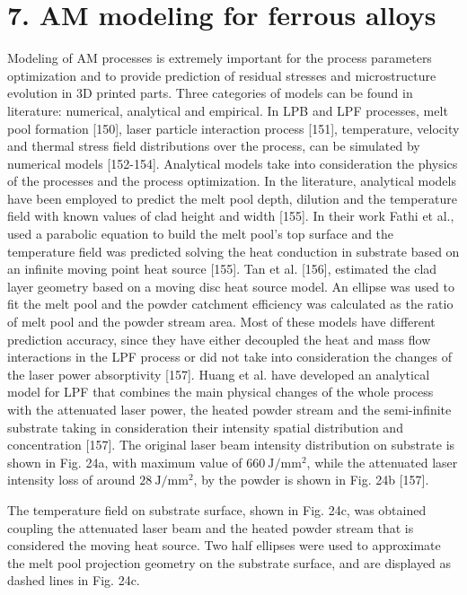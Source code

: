 \documentclass[10pt]{article}
\begin{document}
\section*{7. AM modeling for ferrous alloys}
Modeling of AM processes is extremely important for the process parameters optimization and to provide prediction of residual stresses and microstructure evolution in 3D printed parts. Three categories of models can be found in literature: numerical, analytical and empirical. In LPB and LPF processes, melt pool formation [150], laser particle interaction process [151], temperature, velocity and thermal stress field distributions over the process, can be simulated by numerical models [152-154]. Analytical models take into consideration the physics of the processes and the process optimization. In the literature, analytical models have been employed to predict the melt pool depth, dilution and the temperature field with known values of clad height and width [155]. In their work Fathi et al., used a parabolic equation to build the melt pool's top surface and the temperature field was predicted solving the heat conduction in substrate based on an infinite moving point heat source [155]. Tan et al. [156], estimated the clad layer geometry based on a moving disc heat source model. An ellipse was used to fit the melt pool and the powder catchment efficiency was calculated as the ratio of melt pool and the powder stream area. Most of these models have different prediction accuracy, since they have either decoupled the heat and mass flow interactions in the LPF process or did not take into consideration the changes of the laser power absorptivity [157]. Huang et al. have developed an analytical model for LPF that combines the main physical changes of the whole process with the attenuated laser power, the heated powder stream and the semi-infinite substrate taking in consideration their intensity spatial distribution and concentration [157]. The original laser beam intensity distribution on substrate is shown in Fig. 24a, with maximum value of $660 \mathrm{~J} / \mathrm{mm}^{2}$, while the attenuated laser intensity loss of around $28 \mathrm{~J} / \mathrm{mm}^{2}$, by the powder is shown in Fig. 24b [157].

The temperature field on substrate surface, shown in Fig. 24c, was obtained coupling the attenuated laser beam and the heated powder stream that is considered the moving heat source. Two half ellipses were used to approximate the melt pool projection geometry on the substrate surface, and are displayed as dashed lines in Fig. 24c.
\end{document}
